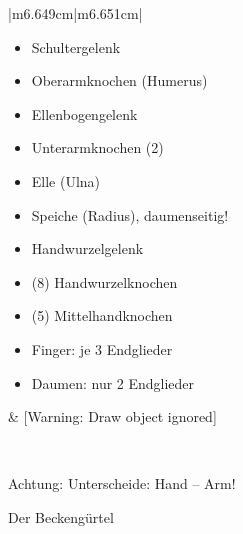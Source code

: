 \documentclass{article}
\begin{document}
\begin{center}
\tablehead{}\begin{supertabular}{|m{6.649cm}|m{6.651cm}|}
\hline
\begin{itemize}
\item Schultergelenk

\item Oberarmknochen  (Humerus)

\item Ellenbogengelenk

\item Unterarmknochen (2)

\end{itemize}
\begin{itemize}
\item Elle  (Ulna) 

\item Speiche  (Radius), daumenseitig!

\end{itemize}
\begin{itemize}
\item Handwurzelgelenk

\item (8) Handwurzelknochen

\item (5) Mittelhandknochen 

\item Finger: je 3  Endglieder

\item Daumen: nur 2  Endglieder

\end{itemize}
 &
[Warning: Draw object ignored]

\\\hline
\end{supertabular}
\end{center}
Achtung: Unterscheide: Hand -- Arm!

Der Beckeng\"urtel
\end{document}
